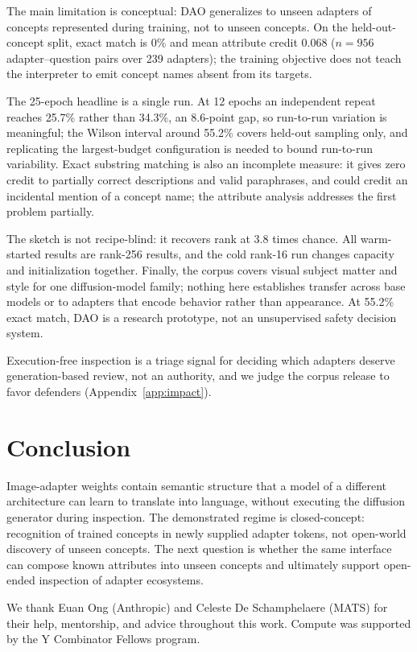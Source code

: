 \documentclass{article}
\begin{document}
The main limitation is conceptual: DAO generalizes to unseen adapters of concepts represented during
training, not to unseen concepts. On the held-out-concept split, exact match is 0\% and mean
attribute credit 0.068 ($n=956$ adapter--question pairs over 239 adapters); the training objective does not teach the interpreter to emit
concept names absent from its targets.

The 25-epoch headline is a single run. At 12 epochs an independent repeat reaches 25.7\% rather than
34.3\%, an 8.6-point gap, so run-to-run variation is meaningful; the Wilson interval around 55.2\% covers held-out
sampling only, and replicating the largest-budget configuration is needed to bound run-to-run
variability. Exact
substring matching is also an incomplete measure: it gives zero credit to partially correct
descriptions and valid paraphrases, and could credit an incidental mention of a concept name; the
attribute analysis addresses the first problem partially.

The sketch is not recipe-blind: it recovers rank at 3.8 times chance. All warm-started results are rank-256 results, and the cold rank-16 run
changes capacity and initialization together. Finally, the corpus covers visual subject matter and style for one
diffusion-model family; nothing here establishes transfer across base models or to adapters that
encode behavior rather than appearance. At 55.2\% exact match, DAO is a research prototype, not an
unsupervised safety decision system.

Execution-free inspection is a triage signal for deciding which adapters deserve
generation-based review, not an authority, and we judge the corpus release to favor defenders
(Appendix~\ref{app:impact}).

\section{Conclusion}

Image-adapter weights contain semantic structure that a model of a different architecture can
learn to translate into language, without executing the diffusion generator during inspection. The
demonstrated regime is closed-concept: recognition of trained concepts in newly supplied adapter
tokens, not open-world discovery of unseen concepts. The next question is whether the same interface
can compose known attributes into unseen concepts and ultimately support open-ended inspection of
adapter ecosystems.

\begin{ack}
We thank Euan Ong (Anthropic) and Celeste De Schamphelaere (MATS) for their help, mentorship, and
advice throughout this work. Compute was supported by the Y Combinator Fellows program.
\end{ack}
\end{document}
